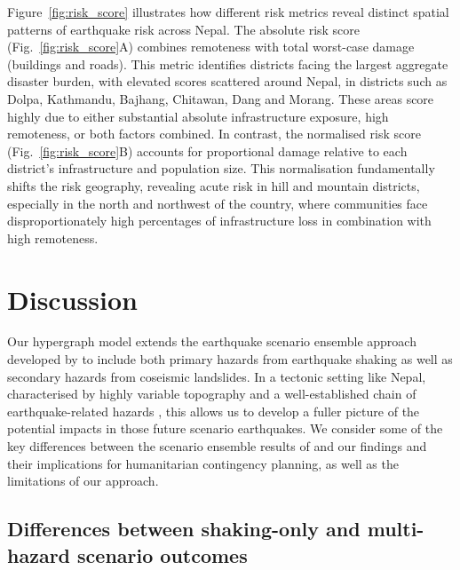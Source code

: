 \documentclass[nhess, manuscript]{copernicus}
\begin{document}
Figure~\ref{fig:risk_score} illustrates how different risk metrics reveal distinct spatial patterns of earthquake risk across Nepal. The absolute risk score (Fig.~\ref{fig:risk_score}A) combines remoteness with total worst-case damage (buildings and roads). This metric identifies districts facing the largest aggregate disaster burden, with elevated scores scattered around Nepal, in districts such as Dolpa, Kathmandu, Bajhang, Chitawan, Dang and Morang. These areas score highly due to either substantial absolute infrastructure exposure, high remoteness, or both factors combined. In contrast, the normalised risk score (Fig.~\ref{fig:risk_score}B) accounts for proportional damage relative to each district's infrastructure and population size. This normalisation fundamentally shifts the risk geography, revealing acute risk in hill and mountain districts, especially in the north and northwest of the country, where communities face disproportionately high percentages of infrastructure loss in combination with high remoteness. 

\section{Discussion}

Our hypergraph model extends the earthquake scenario ensemble approach developed by \citet{Robinson2018} to include both primary hazards from earthquake shaking as well as secondary hazards from coseismic landslides. In a tectonic setting like Nepal, characterised by highly variable topography and a well-established chain of earthquake-related hazards \citep{Kincey2021}, this allows us to develop a fuller picture of the potential impacts in those future scenario earthquakes. We consider some of the key differences between the scenario ensemble results of \citet{Robinson2018} and our findings and their implications for humanitarian contingency planning, as well as the limitations of our approach.

\subsection{Differences between shaking-only and multi-hazard scenario outcomes}
\end{document}
